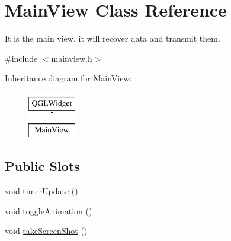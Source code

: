 \hypertarget{class_main_view}{}\section{Main\+View Class Reference}
\label{class_main_view}


It is the main view, it will recover data and transmit them.  




{\ttfamily \#include $<$mainview.\+h$>$}

Inheritance diagram for Main\+View\+:\begin{figure}[H]
\begin{center}
\leavevmode
\includegraphics[height=2.000000cm]{class_main_view}
\end{center}
\end{figure}
\subsection*{Public Slots}
\begin{DoxyCompactItemize}
\item 
void \hyperlink{class_main_view_a456d4761f9c8dcf828ea4fcfac37c21a}{timer\+Update} ()
\item 
void \hyperlink{class_main_view_afbc772adcee43265ce364ff656c19500}{toggle\+Animation} ()
\item 
void \hyperlink{class_main_view_a8e1549cbc6edb92d9eedfeae3976f161}{take\+Screen\+Shot} ()
\end{DoxyCompactItemize}
